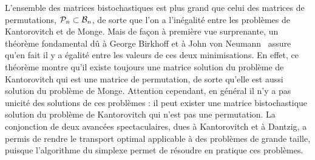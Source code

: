 
L'ensemble des matrices bistochastiques est plus grand que celui des matrices de permutations, $\mathcal{P}_n \subset \mathcal{B}_n$, de sorte que l'on a l'inégalité 
entre les problèmes de Kantorovitch et de Monge. Mais de façon à première vue surprenante, un théorème fondamental dû à George Birkhoff et à John von Neumann~\cite{birkhoff,von1953certain} assure qu'en fait il y a égalité entre les valeurs de ces deux minimisations. En effet, ce théorème montre qu'il existe toujours une matrice solution du problème de Kantorovitch qui est une matrice de permutation, de sorte qu'elle est aussi solution du problème de Monge. Attention cependant, en général il n'y a pas unicité des solutions de ces problèmes : il peut exister une matrice bistochastique solution du problème de Kantorovitch qui n'est pas une permutation. 
%
La conjonction de deux avancées spectaculaires, dues à Kantorovitch et à Dantzig, a permis de rendre le transport optimal applicable à des problèmes de grande taille, puisque l'algorithme du simplexe permet de résoudre en pratique ces problèmes. 


